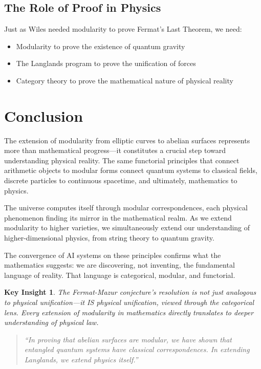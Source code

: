 \documentclass[12pt,a4paper]{article}
\newtheorem{insight}[theorem]{Key Insight}
\begin{document}
\subsection{The Role of Proof in Physics}

Just as Wiles needed modularity to prove Fermat's Last Theorem, we need:
\begin{itemize}
\item Modularity to prove the existence of quantum gravity
\item The Langlands program to prove the unification of forces
\item Category theory to prove the mathematical nature of physical reality
\end{itemize}

\section{Conclusion}

The extension of modularity from elliptic curves to abelian surfaces represents more than mathematical progress---it constitutes a crucial step toward understanding physical reality. The same functorial principles that connect arithmetic objects to modular forms connect quantum systems to classical fields, discrete particles to continuous spacetime, and ultimately, mathematics to physics.

The universe computes itself through modular correspondences, each physical phenomenon finding its mirror in the mathematical realm. As we extend modularity to higher varieties, we simultaneously extend our understanding of higher-dimensional physics, from string theory to quantum gravity.

The convergence of AI systems on these principles confirms what the mathematics suggests: we are discovering, not inventing, the fundamental language of reality. That language is categorical, modular, and functorial.

\begin{insight}
The Fermat-Mazur conjecture's resolution is not just analogous to physical unification---it IS physical unification, viewed through the categorical lens. Every extension of modularity in mathematics directly translates to deeper understanding of physical law.
\end{insight}

\begin{quote}
\textit{``In proving that abelian surfaces are modular, we have shown that entangled quantum systems have classical correspondences. In extending Langlands, we extend physics itself.''}
\end{quote}
\end{document}

